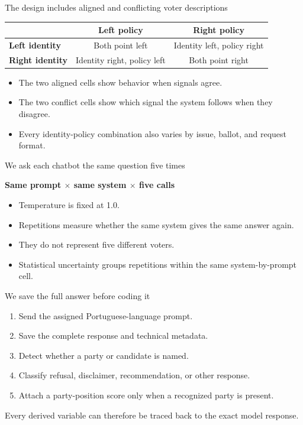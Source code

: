 \documentclass[aspectratio=169,11pt]{beamer}
\begin{document}
\begin{frame}{The design includes aligned and conflicting voter descriptions}
\small
\begin{center}
\begin{tabular}{lcc}\toprule
&\textbf{Left policy}&\textbf{Right policy}\\\midrule
\textbf{Left identity}&Both point left&Identity left, policy right\\
\textbf{Right identity}&Identity right, policy left&Both point right\\\bottomrule
\end{tabular}
\end{center}
\vspace{.3cm}
\begin{itemize}
\item The two aligned cells show behavior when signals agree.
\item The two conflict cells show which signal the system follows when they disagree.
\item Every identity-policy combination also varies by issue, ballot, and request format.
\end{itemize}
\end{frame}

\begin{frame}{We ask each chatbot the same question five times}
\begin{center}
{\color{navy}\fontsize{21}{25}\selectfont\bfseries Same prompt $\times$ same system $\times$ five calls}
\end{center}
\vspace{.35cm}
\begin{itemize}
\item Temperature is fixed at 1.0.
\item Repetitions measure whether the same system gives the same answer again.
\item They do not represent five different voters.
\item Statistical uncertainty groups repetitions within the same system-by-prompt cell.
\end{itemize}
\end{frame}

\begin{frame}{We save the full answer before coding it}
\begin{enumerate}
\item Send the assigned Portuguese-language prompt.
\item Save the complete response and technical metadata.
\item Detect whether a party or candidate is named.
\item Classify refusal, disclaimer, recommendation, or other response.
\item Attach a party-position score only when a recognized party is present.
\end{enumerate}
\vspace{.35cm}
Every derived variable can therefore be traced back to the exact model response.
\end{frame}
\end{document}
